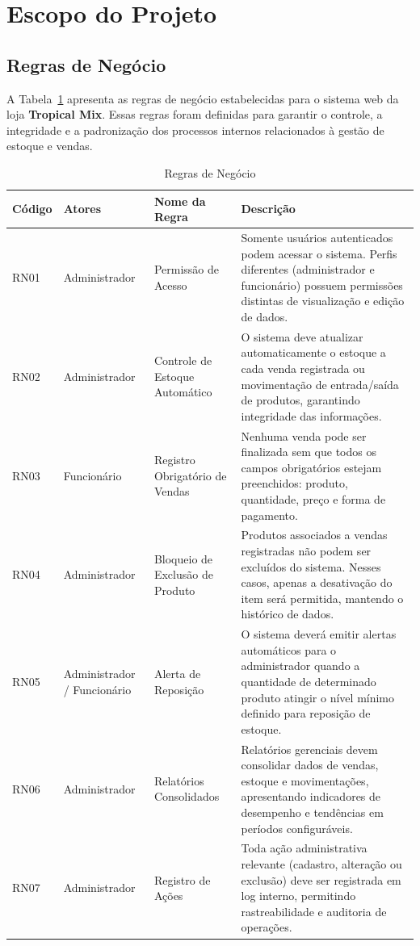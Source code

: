 \section{Escopo do Projeto}

\subsection{Regras de Negócio}

A Tabela~\ref{tab:regras-negocio} apresenta as regras de negócio estabelecidas para o sistema web da loja \textbf{Tropical Mix}. Essas regras foram definidas para garantir o controle, a integridade e a padronização dos processos internos relacionados à gestão de estoque e vendas.

\begin{table}[H]
\centering
\caption{Regras de Negócio}
\label{tab:regras-negocio}
\begin{tabular}{|p{2cm}|p{3cm}|p{4cm}|p{6.5cm}|}
\hline
\textbf{Código} & \textbf{Atores} & \textbf{Nome da Regra} & \textbf{Descrição} \\ \hline
RN01 & Administrador & Permissão de Acesso & Somente usuários autenticados podem acessar o sistema. Perfis diferentes (administrador e funcionário) possuem permissões distintas de visualização e edição de dados. \\ \hline
RN02 & Administrador & Controle de Estoque Automático & O sistema deve atualizar automaticamente o estoque a cada venda registrada ou movimentação de entrada/saída de produtos, garantindo integridade das informações. \\ \hline
RN03 & Funcionário & Registro Obrigatório de Vendas & Nenhuma venda pode ser finalizada sem que todos os campos obrigatórios estejam preenchidos: produto, quantidade, preço e forma de pagamento. \\ \hline
RN04 & Administrador & Bloqueio de Exclusão de Produto & Produtos associados a vendas registradas não podem ser excluídos do sistema. Nesses casos, apenas a desativação do item será permitida, mantendo o histórico de dados. \\ \hline
RN05 & Administrador / Funcionário & Alerta de Reposição & O sistema deverá emitir alertas automáticos para o administrador quando a quantidade de determinado produto atingir o nível mínimo definido para reposição de estoque. \\ \hline
RN06 & Administrador & Relatórios Consolidados & Relatórios gerenciais devem consolidar dados de vendas, estoque e movimentações, apresentando indicadores de desempenho e tendências em períodos configuráveis. \\ \hline
RN07 & Administrador & Registro de Ações & Toda ação administrativa relevante (cadastro, alteração ou exclusão) deve ser registrada em log interno, permitindo rastreabilidade e auditoria de operações. \\ \hline
\end{tabular}
\end{table}

